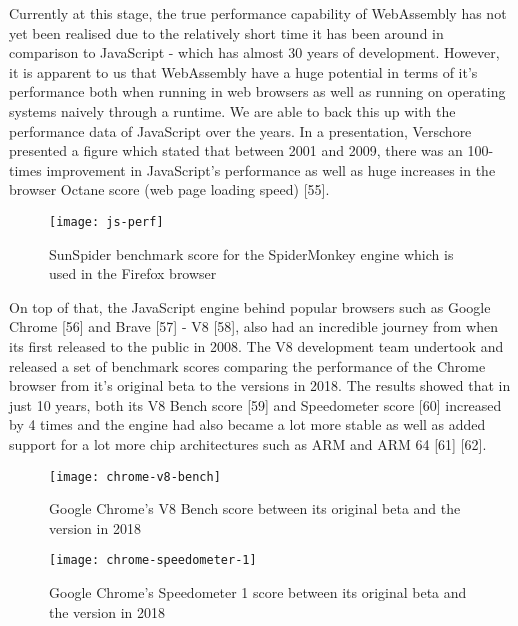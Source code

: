 Currently at this stage, the true performance capability of WebAssembly has not yet been realised due to the relatively short time it has been around in comparison to JavaScript - which has almost 30 years of development. However, it is apparent to us that WebAssembly have a huge potential in terms of it's performance both when running in web browsers as well as running on operating systems naively through a runtime. We are able to back this up with the performance data of JavaScript over the years. In a presentation, Verschore presented a figure which stated that between 2001 and 2009, there was an 100-times improvement in JavaScript's performance as well as huge increases in the browser Octane score (web page loading speed) [55].

\begin{figure}[!ht]
\centering
\texttt{[image: js-perf]}
\caption{\footnotesize{SunSpider benchmark score for the SpiderMonkey engine which is used in the Firefox browser}}
\captionsetup{aboveskip=0pt,font=it}
\label{fig:javascript_meme}
\end{figure}

\bigskip
\bigskip

On top of that, the JavaScript engine behind popular browsers such as Google Chrome [56] and Brave [57] - V8 [58], also had an incredible journey from when its first released to the public in 2008. The V8 development team undertook and released a set of benchmark scores comparing the performance of the Chrome browser from it's original beta to the versions in 2018. The results showed that in just 10 years, both its V8 Bench score [59] and Speedometer score [60] increased by 4 times and the engine had also became a lot more stable as well as added support for a lot more chip architectures such as ARM and ARM 64 [61] [62].

\bigskip

\begin{figure}[hp]
\centering
\texttt{[image: chrome-v8-bench]}
\caption{\footnotesize{Google Chrome's V8 Bench score between its original beta and the version in 2018}}
\captionsetup{aboveskip=0pt,font=it}
\label{fig:javascript_meme}
\end{figure}

\bigskip
\bigskip

\bigskip

\begin{figure}[hp]
\centering
\texttt{[image: chrome-speedometer-1]}
\caption{\footnotesize{Google Chrome's Speedometer 1 score between its original beta and the version in 2018}}
\captionsetup{aboveskip=0pt,font=it}
\label{fig:javascript_meme}
\end{figure}

